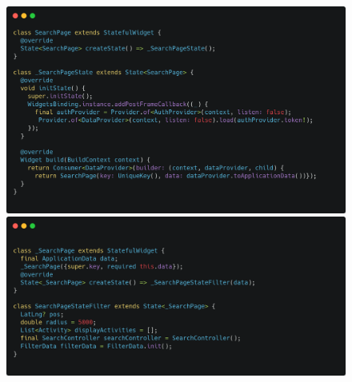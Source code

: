 \documentclass[a4paper,12pt]{article}
\begin{document}
\begin{figure}[H]
    \begin{minipage}{0.49\textwidth}
        \centering
        \includegraphics[width=1\linewidth]{img/search_page.png}
    \end{minipage}\hfill
    \begin{minipage}{0.49\textwidth}
        \centering
        \includegraphics[width=1\linewidth]{img/search_state.png}
    \end{minipage}
\end{figure}
\end{document}
